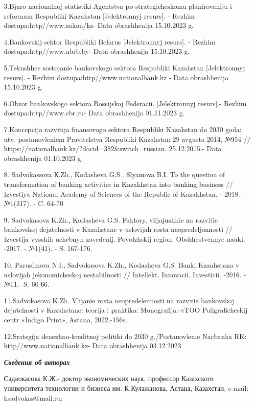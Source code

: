 3.Bjuro nacional\textquotesingle noj statistiki Agentstva po
strategicheskomu planirovaniju i reformam Respubliki Kazahstan
{[}Jelektronnyj resurs{]}. - Rezhim dostupa:http//www.zakon/kz- Data
obrashhenija 15.10.2023 g.

4.Bankovskij sektor Respubliki Belarus\textquotesingle{} {[}Jelektronnyj
resurs{]}. - Rezhim dostupa:http//www.nbrb.by- Data obrashhenija
15.10.2023 g.

5.Tekushhee sostojanie bankovskogo sektora Respubliki Kazahstan
{[}Jelektronnyj resurs{]}. - Rezhim dostupa:http//www.nationalbank.kz -
Data obrashhenija 15.10.2023 g.

6.Obzor bankovskogo sektora Rossijskoj Federacii. {[}Jelektronnyj
resurs{]}.- Rezhim dostupa:http//www.cbr.ru- Data obrashhenija
01.11.2023 g.

7.Koncepcija razvitija finansovogo sektora Respubliki Kazahstan do 2030
goda: utv. postanovleniem Pravitel\textquotesingle stva Respubliki
Kazahstan 29 avgusta 2014, №954 //
https://nationalbank.kz/?docid=382\&switch=russian. 25.12.2015.- Data
obrashhenija 01.10.2023 g.

8. Sadvokassova К.Zh., Kodasheva G.S., Slyamova B.I. To the question of
transformation of banking activities in Kazakhstan into banking business
// Izvestiya National Academy of Sciences of the Republic of Kazakhstan.
- 2018. - №1(317). - C. 64-70

9. Sadvokasova K.Zh., Kodasheva G.S. Faktory, vlijajushhie na razvitie
bankovskoj dejatel\textquotesingle nosti v Kazahstane v uslovijah rosta
neopredeljonnosti // Izvestija vysshih uchebnyh zavedenij. Povolzhskij
region. Obshhestvennye nauki. -2017. - №1(41). - S. 167-176.

10. Parusimova N.I., Sadvokasova K.Zh., Kodasheva G.S. Banki Kazahstana
v uslovijah jekonomicheskoj nestabil\textquotesingle nosti // Intellekt.
Innovacii. Investicii. -2016. - №11.- S. 60-66.

11.Sadvokasova K.Zh. Vlijanie rosta neopredelennosti na razvitie
bankovskoj dejatel\textquotesingle nosti v Kazahstane: teorija i
praktika: Monografija.-«TOO Poligraficheskij centr «Indigo Print»,
Astana, 2022.-156s.

12.Srategija denezhno-kreditnoj politiki do 2030 g./Postanovlenie
Nacbanka RK: http//www.nationalbank.kz- Data obrashhenija 03.12.2023

\emph{{\bfseries Сведения об авторах}}

Садвокасова К.Ж.- доктор экономических наук, профессор Казахского
университета технологии и бизнеса им. К.Кулажанова, Астана, Казахстан,
e-mail: ksadvokas@mail.ru;

